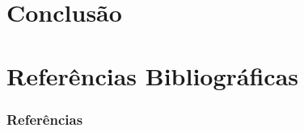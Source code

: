 \documentclass[10pt,xcolor={dvipsnames}]{beamer}
\begin{document}
\section{Conclusão}
\subsection{}

\section{Referências Bibliográficas}
\begin{frame}[allowframebreaks]
	\frametitle{Referências}
%	
%	
	
\end{frame}

{\1
\begin{frame}
\end{frame}}
\end{document}
